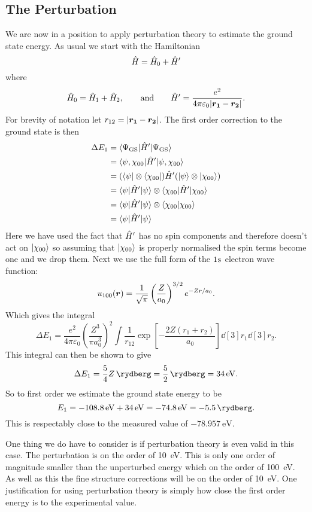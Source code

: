     \subsection{The Perturbation}
    We are now in a position to apply perturbation theory to estimate the ground state energy.
    As usual we start with the Hamiltonian
    \[\hat{H} = \hat{H}_0 + \hat{H}'\]
    where
    \[\hat{H}_0 = \hat{H}_1 + \hat{H}_2, \qquad\text{and}\qquad \hat{H}' = \frac{e^2}{4\pi\varepsilon_0\abs{\bm{r_1}-\bm{r_2}}}.\]
    For brevity of notation let \(r_{12} = \abs{\bm{r_1} - \bm{r_2}}\).
    The first order correction to the ground state is then
    \begin{align*}
        \Delta E_1 &= \langle {\Psi_{\mathrm{GS}}} \vert \hat{H}' \vert {\Psi_{\mathrm{GS}}} \rangle\\
        &= \langle {\psi, \chi_{00}} \vert \hat{H}' \vert {\psi, \chi_{00}} \rangle\\
        &= (\langle {\psi} \vert\otimes\langle {\chi_{00}} \vert) \hat{H}' (\vert {\psi} \rangle \otimes \vert {\chi_{00}} \rangle)\\
        &= \langle {\psi} \vert\hat{H}'\vert {\psi} \rangle \otimes \langle {\chi_{00}} \vert \hat{H}' \vert {\chi_{00}} \rangle\\
        &= \langle {\psi} \vert\hat{H}'\vert {\psi} \rangle \otimes \langle {\chi_{00}} \vert {\chi_{00}} \rangle\\
        &= \langle {\psi} \vert\hat{H}'\vert {\psi} \rangle
    \end{align*}
    Here we have used the fact that \(\hat{H}'\) has no spin components and therefore doesn't act on \(\vert {\chi_{00}} \rangle\) so assuming that \(\vert {\chi_{00}} \rangle\) is properly normalised the spin terms become one and we drop them.
    Next we use the full form of the \(\termNotation[1]{}{\mathrm{s}}{}\) electron wave function:
    \[u_{100}(\bm{r}) = \frac{1}{\sqrt{\pi}} \left(\frac{Z}{a_0}\right)^{3/2}e^{-Zr/a_0}.\]
    Which gives the integral
    \[\Delta E_1 = \frac{e^2}{4\pi\varepsilon_0} \left(\frac{Z^3}{\pi a_0^3}\right)^{2} \int \frac{1}{r_{12}} \exp\left[-\frac{2Z(r_1 + r_2)}{a_0}\right] \dd[3]{r_1}\dd[3]{r_2}.\]
    This integral can then be shown to give
    \[\Delta E_1 = \frac{5}{4}Z\,\si{\rydberg} = \frac{5}{2}\,\si{\rydberg} = \SI{34}{\electronvolt}.\]
    So to first order we estimate the ground state energy to be
    \[E_1 = -\SI{108.8}{\electronvolt} + \SI{34}{\electronvolt} = -\SI{74.8}{\electronvolt} = -\SI{5.5}{\rydberg}.\]
    This is respectably close to the measured value of \(-\SI{78.957}{\electronvolt}\).
    
    One thing we do have to consider is if perturbation theory is even valid in this case.
    The perturbation is on the order of \SI{10}{\electronvolt}.
    This is only one order of magnitude smaller than the unperturbed energy which on the order of \SI{100}{\electronvolt}.
    As well as this the fine structure corrections will be on the order of \SI{10}{\electronvolt}.
    One justification for using perturbation theory is simply how close the first order energy is to the experimental value.
    
